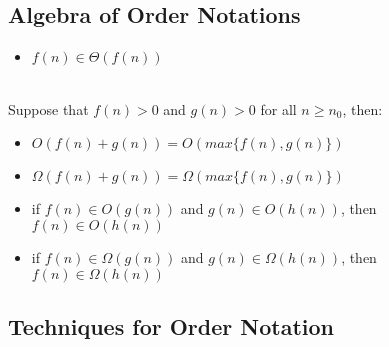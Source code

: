 \documentclass[letterpaper, 12pt]{article}
\newcommand{\red}[1]{{\color{red}{#1}}}
\begin{document}
    \subsection{Algebra of Order Notations}
    \textbf{\red{Identity rule}}
    \begin{itemize}
        \item $f(n) \in \Theta(f(n))$
    \end{itemize}
    \textbf{\red{Maximum rules}}\\
    Suppose that $f(n) > 0$ and $g(n) > 0$ for all $n \geq n_0$, then:
    \begin{itemize}
        \item $O(f(n) + g(n)) = O(max\{f(n), g(n)\})$
        \item $\Omega(f(n) + g(n)) = \Omega(max\{f(n), g(n)\})$
    \end{itemize}
    \textbf{\red{Transitivity}}
    \begin{itemize}
        \item if $f(n) \in O(g(n))$ and $g(n) \in O(h(n))$, then $f(n) \in O(h(n))$
        \item if $f(n) \in \Omega(g(n))$ and $g(n) \in \Omega(h(n))$, then $f(n) \in \Omega(h(n))$
    \end{itemize}

    \subsection{Techniques for Order Notation}
\end{document}
